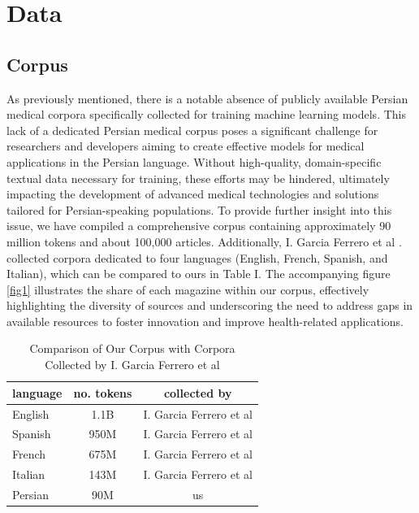 \documentclass[conference]{IEEEtran}
\begin{document}
\section{Data}

\subsection{Corpus}
As previously mentioned, there is a notable absence of publicly available Persian medical corpora specifically collected for training machine learning models. This lack of a dedicated Persian medical corpus poses a significant challenge for researchers and developers aiming to create effective models for medical applications in the Persian language. Without high-quality, domain-specific textual data necessary for training, these efforts may be hindered, ultimately impacting the development of advanced medical technologies and solutions tailored for Persian-speaking populations. To provide further insight into this issue, we have compiled a comprehensive corpus containing approximately 90 million tokens and about 100,000 articles. Additionally, I. Garcia Ferrero et al
\cite{b4}
. collected corpora dedicated to four languages (English, French, Spanish, and Italian), which can be compared to ours in Table I. The accompanying figure \ref{fig1} illustrates the share of each magazine within our corpus, effectively highlighting the diversity of sources and underscoring the need to address gaps in available resources to foster innovation and improve health-related applications.

\begin{table}[ht]
	\centering
	\caption{Comparison of Our Corpus with Corpora Collected by I. Garcia Ferrero et al}
	\begin{tabular}{|l|c|c|}  %
		\hline
		language& no. tokens & collected by \\ \hline
		English & 1.1B & I. Garcia Ferrero et al \\ \hline
		Spanish & 950M & I. Garcia Ferrero et al  \\ \hline
		French & 675M & I. Garcia Ferrero et al  \\ \hline
		Italian& 143M &  I. Garcia Ferrero et al  \\ \hline
		Persian& 90M & us	\\ \hline
	\end{tabular}
	\label{tab:model_results_on_mcqa}
\end{table}
\end{document}
